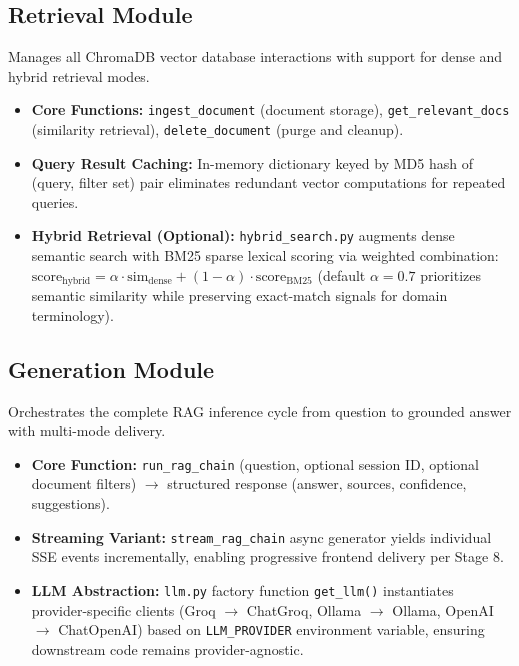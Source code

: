 \subsection{Retrieval Module}

Manages all ChromaDB vector database interactions with support for dense and hybrid retrieval modes.

\begin{itemize}
\item \textbf{Core Functions:} \texttt{ingest\_document} (document storage), \texttt{get\_relevant\_docs} (similarity retrieval), \texttt{delete\_document} (purge and cleanup).

\item \textbf{Query Result Caching:} In-memory dictionary keyed by MD5 hash of (query, filter set) pair eliminates redundant vector computations for repeated queries.

\item \textbf{Hybrid Retrieval (Optional):} \texttt{hybrid\_search.py} augments dense semantic search with BM25 sparse lexical scoring via weighted combination: $\text{score}_{\text{hybrid}} = \alpha \cdot \text{sim}_{\text{dense}} + (1 - \alpha) \cdot \text{score}_{\text{BM25}}$ (default $\alpha = 0.7$ prioritizes semantic similarity while preserving exact-match signals for domain terminology).
\end{itemize}

\subsection{Generation Module}

Orchestrates the complete RAG inference cycle from question to grounded answer with multi-mode delivery.

\begin{itemize}
\item \textbf{Core Function:} \texttt{run\_rag\_chain} (question, optional session ID, optional document filters) $\rightarrow$ structured response (answer, sources, confidence, suggestions).

\item \textbf{Streaming Variant:} \texttt{stream\_rag\_chain} async generator yields individual SSE events incrementally, enabling progressive frontend delivery per Stage 8.

\item \textbf{LLM Abstraction:} \texttt{llm.py} factory function \texttt{get\_llm()} instantiates provider-specific clients (Groq $\rightarrow$ ChatGroq, Ollama $\rightarrow$ Ollama, OpenAI $\rightarrow$ ChatOpenAI) based on \texttt{LLM\_PROVIDER} environment variable, ensuring downstream code remains provider-agnostic.
\end{itemize}

